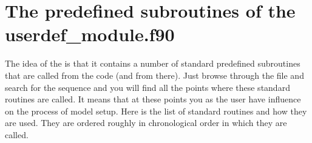 \documentclass[letterpaper,10pt,english]{sphinxmanual}
\begin{document}
\section{The pre\sphinxhyphen{}defined subroutines of the userdef\_module.f90}
\label{\detokenize{internalsetup:the-pre-defined-subroutines-of-the-userdef-module-f90}}\label{\detokenize{internalsetup:sec-predef-userdef}}
The idea of the  is that it contains a number of standard
pre\sphinxhyphen{}defined subroutines that are called from the  code (and 
from there). Just browse through the  file and search for the
sequence  and you will find all the points where these standard
routines are called. It means that at these points you as the user have
influence on the process of model setup. Here is the list of standard routines
and how they are used. They are ordered roughly in chronological order in which
they are called.
\end{document}
